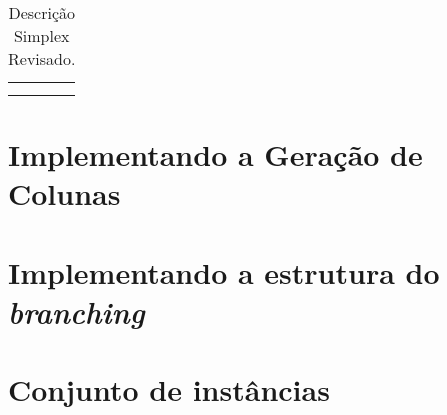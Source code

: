 \begin{table}[htpb!]
\begin{tabular}{|p{}p{}p{}|}
\begin{description}
            \end{description} &  \\
         &    &  \\
 
        \hline
        \end{tabular}
        \caption{Descrição Simplex Revisado.}
        \end{table}
        

            

\section{Implementando a Geração de Colunas} \label{sec:implementandoGC}

\section{Implementando a estrutura do \textit{branching}} \label{sec:implementandoBranching}

\section{Conjunto de instâncias} \label{sec:instancias}

